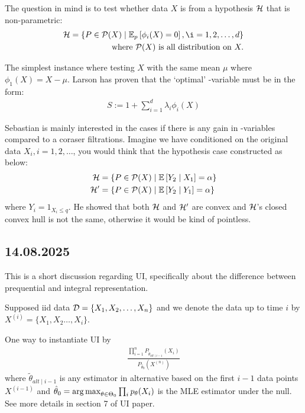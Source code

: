 The question in mind is to test whether data $X$ is from a hypothesis $\mathcal{H}$ that
is non-parametric:
\begin{align*}
	\Hc = \left\{P \in \Pc(X) \mid \ERWi{p}{\phi_i(X)=0}, \i=1,2,\dots,d\right\} \\
	\text{where } \Pc(X) \text{ is all distribution on } X.
\end{align*}

The simplest instance where testing $X$ with the same mean $\mu$ where
$\phi_1(X)=X-\mu$.
Larson has proven that the `optimal' \E-variable must be in the form:
\begin{align*}
	S := 1 +\sum_{i=1}^d \lambda_i \phi_i(X)
\end{align*}

Sebastian is mainly interested in the cases if there is any gain in \E-variables
compared to a coraser filtrations.
Imagine we have conditioned on the original data $X_i, i=1,2,\dots$, you would think
that the hypothesis case constructed as below:
\begin{align}
	\Hc  & = \left\{P \in \Pc(X) \mid \condERW{Y_2}{X_1} = \alpha \right\} \\
	\Hc' & = \left\{P \in \Pc(X) \mid \condERW{Y_2}{Y_1} = \alpha \right\}
\end{align}
where $Y_i = 1_{X_i \leq q}$. He showed that both $\mathcal{H}$ and $\mathcal{H}'$ are convex
and $\mathcal{H}$'s closed convex hull is not the same, otherwise it would be kind of pointless.


\subsection*{14.08.2025}

This is a short discussion regarding UI, specifically about the difference
between prequential and integral representation.

Supposed iid data $\mathcal{D}=\{X_1,X_2,\dots,X_n\}$ and we denote
the data up to time $i$ by $X^{(i)}=\{X_1,X_2\dots,X_i\}$.

One way to instantiate UI by
\begin{align*}
	\frac{\prod_{i=1}^n P_{\tilde{\theta}_{alt\mid i-1}}(X_i)}{P_{\hat{\theta}_0}(X^{(n)})}
\end{align*}
where $\tilde{\theta}_{alt\mid i-1}$ is any estimator in alternative based on
the first $i-1$ data points $X^{(i-1)}$
and $\hat{\theta}_0=\operatorname*{arg\, max}_{\theta\in\Theta_0} \prod_i p_{\theta}(X_i)$
is the MLE estimator under the null.
See more details in section 7 of UI paper.


